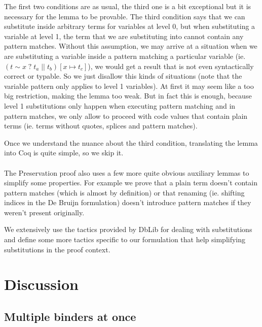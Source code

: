 \documentclass[runningheads]{article}
\begin{document}
The first two conditions are as usual, the third one is a bit exceptional but it is necessary for the lemma to be provable.
The third condition says that we can substitute inside arbitrary terms for variables at level 0, but when substituting a variable at level 1, the term that we are substituting into cannot contain any pattern matches. Without this assumption, we may arrive at a situation when we are substituting a variable inside a pattern matching a particular variable (ie. $(t \sim x \; ? \; t_a \; || \; t_b)[x \mapsto t_c]$), we would get a result that is not even syntactically correct or typable. So we just disallow this kinds of situations (note that the variable pattern only applies to level 1 variables). At first it may seem like a too big restriction, making the lemma too weak. But in fact this is enough, because level 1 substitutions only happen when executing pattern matching and in pattern matches, we only allow to proceed with code values that contain plain terms (ie. terms without quotes, splices and pattern matches).

Once we understand the nuance about the third condition, translating the lemma into Coq is quite simple, so we skip it.

\paragraph{}

The Preservation proof also uses a few more quite obvious auxiliary lemmas to simplify some properties. For example we prove that a plain term doesn't contain pattern matches (which is almost by definition) or that renaming (ie. shifting indices in the De Bruijn formulation) doesn't introduce pattern matches if they weren't present originally. %

We extensively use the tactics provided by DbLib for dealing with substitutions and define some more tactics specific to our formulation that help simplifying substitutions in the proof context.
\section{Discussion}
\label{sec:discussion}
\subsection{Multiple binders at once}
\label{multibind}
\end{document}
